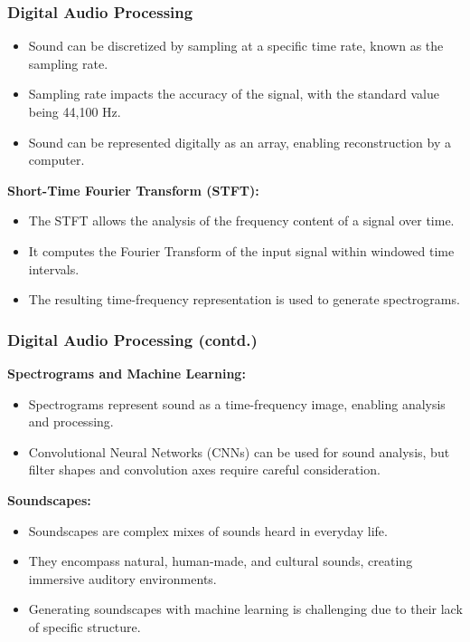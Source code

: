 \begin{frame}
    \frametitle{Digital Audio Processing}

    \begin{itemize}
        \item Sound can be discretized by sampling at a specific time rate, known as the sampling rate.
        \item Sampling rate impacts the accuracy of the signal, with the standard value being 44,100 Hz.
        \item Sound can be represented digitally as an array, enabling reconstruction by a computer.
    \end{itemize}

    \textbf{Short-Time Fourier Transform (STFT):}
    \begin{itemize}
        \item The STFT allows the analysis of the frequency content of a signal over time.
        \item It computes the Fourier Transform of the input signal within windowed time intervals.
        \item The resulting time-frequency representation is used to generate spectrograms.
    \end{itemize}
\end{frame}

\begin{frame}
    \frametitle{Digital Audio Processing (contd.)}

    \textbf{Spectrograms and Machine Learning:}
    \begin{itemize}
        \item Spectrograms represent sound as a time-frequency image, enabling analysis and processing.
        \item Convolutional Neural Networks (CNNs) can be used for sound analysis, but filter shapes and convolution axes require careful consideration.
    \end{itemize}

    \textbf{Soundscapes:}
    \begin{itemize}
        \item Soundscapes are complex mixes of sounds heard in everyday life.
        \item They encompass natural, human-made, and cultural sounds, creating immersive auditory environments.
        \item Generating soundscapes with machine learning is challenging due to their lack of specific structure.
    \end{itemize}
\end{frame}



